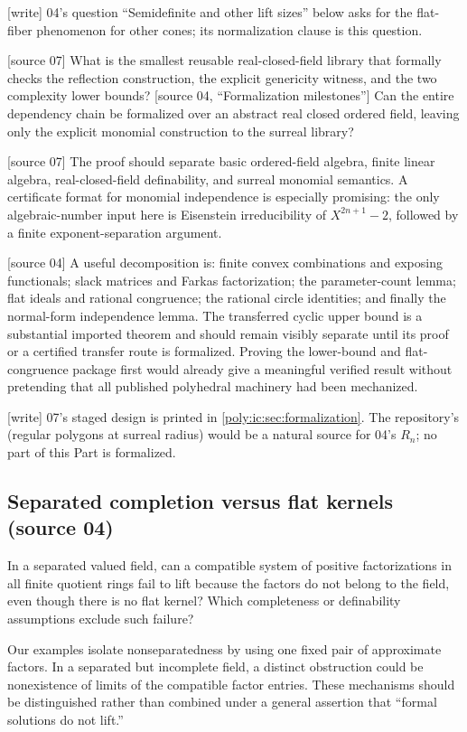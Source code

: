\documentclass[11pt,a4paper]{article}
\numberwithin{equation}{section}
\theoremstyle{plain}
\newcommand{\wtag}{\textup{[write]}}%
\newcommand{\srcnote}[1]{\textup{[#1]}}%
\begin{document}
\wtag{} 04's question ``Semidefinite and other lift sizes'' below asks
for the flat-fiber phenomenon for other cones; its normalization clause is
this question.

\begin{question}
\srcnote{source 07} What is the smallest reusable real-closed-field library that formally
checks the reflection construction, the explicit genericity witness,
and the two complexity lower bounds?
\srcnote{source 04, ``Formalization milestones''}
Can the entire dependency chain be formalized over an abstract real
closed ordered field, leaving only the explicit monomial construction
to the surreal library?
\end{question}
\srcnote{source 07} The proof should separate basic ordered-field algebra, finite linear
algebra, real-closed-field definability, and surreal monomial semantics.
A certificate format for monomial independence is especially promising:
the only algebraic-number input here is Eisenstein irreducibility of
$X^{2n+1}-2$, followed by a finite exponent-separation argument.

\srcnote{source 04} A useful decomposition is: finite convex combinations and exposing
functionals; slack matrices and Farkas factorization; the parameter-count
lemma; flat ideals and rational congruence; the rational circle identities;
and finally the normal-form independence lemma. The transferred cyclic
upper bound is a substantial imported theorem and should remain visibly
separate until its proof or a certified transfer route is formalized.
Proving the lower-bound and flat-congruence package first would already
give a meaningful verified result without pretending that all published
polyhedral machinery had been mechanized.

\wtag{} 07's staged design is printed in \cref{poly:ic:sec:formalization}.
The repository's  (regular
polygons at surreal radius) would be a natural source for 04's $R_n$; no
part of this Part is formalized.

\subsection{Separated completion versus flat kernels (source 04)}
\begin{question}
In a separated valued field, can a compatible system of positive
factorizations in all finite quotient rings fail to lift because the
factors do not belong to the field, even though there is no flat kernel?
Which completeness or definability assumptions exclude such failure?
\end{question}
Our examples isolate nonseparatedness by using one fixed pair of
approximate factors. In a separated but incomplete field, a distinct
obstruction could be nonexistence of limits of the compatible factor
entries. These mechanisms should be distinguished rather than combined
under a general assertion that ``formal solutions do not lift.''
\end{document}
